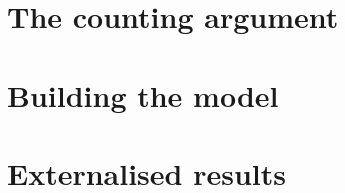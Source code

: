 \documentclass{book}
\begin{document}
\chapter{The counting argument}

\minitoc
\newpage







\chapter{Building the model}

\minitoc
\newpage












\chapter{Externalised results}

\minitoc
\newpage





\printbibliography
\end{document}
